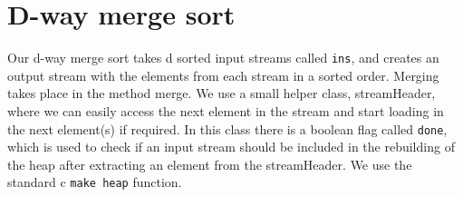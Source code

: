 \section{D-way merge sort}

Our d-way merge sort takes d sorted input streams called \texttt{ins}, and creates an output stream with the elements from each stream in a sorted order. Merging takes place in the method merge. We use a small helper class, streamHeader, where we can easily access the next element in the stream and start loading in the next element(s) if required. In this class there is a boolean flag called \texttt{done}, which is used to check if an input stream should be included in the rebuilding of the heap after extracting an element from the streamHeader.
We use the standard c \texttt{make heap} function.



